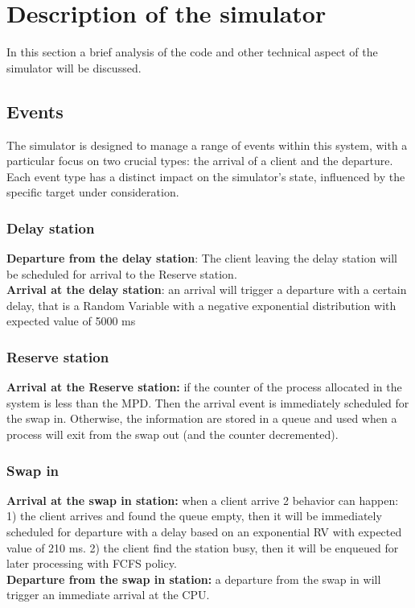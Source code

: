 \documentclass[12pt,a4paper]{article}
\begin{document}
\section{Description of the simulator}
In this section a brief analysis of the code and other technical aspect of the simulator will be discussed.
\subsection{Events}
The simulator is designed to manage a range of events within this system, with a particular focus on two crucial types: the arrival of a client and the departure. Each event type has a distinct impact on the simulator's state, influenced by the specific target under consideration.
\subsubsection{Delay station}

\textbf{Departure from the delay station}: The client leaving the delay station will be scheduled for arrival to the Reserve station.
\\
\textbf{Arrival at the delay station}:
an arrival will trigger a departure with a certain delay, that is a Random Variable with a negative exponential distribution with expected value of 5000 ms
\\
\subsubsection{Reserve station}
\textbf{Arrival at the Reserve station:} if the counter of the process allocated in the system is less than the MPD. Then the  arrival event is immediately scheduled for the swap in. Otherwise, the information are stored in a queue and used when a process will exit from the swap out (and the counter decremented).

\subsubsection{Swap in}
\textbf{Arrival at the swap in station:} when a client arrive 2 behavior can happen: 1) the client arrives and found the queue empty, then it will be immediately scheduled for departure with a delay based on an exponential RV with expected value of 210 ms. 2) the client find the station busy, then it will be enqueued for later processing with FCFS policy.
\\
\textbf{Departure from the swap in station:} a departure from the swap in will trigger an immediate arrival at the CPU.
\end{document}
